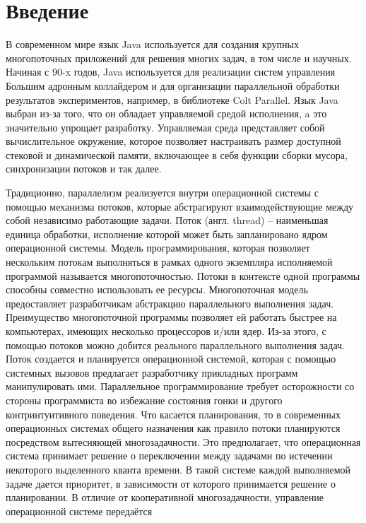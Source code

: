 \section{Введение}
	В современном мире язык Java используется для создания крупных многопоточных приложений 
	для решения многих задач, в том числе и научных. Начиная с 90-x годов, Java используется для реализации
	систем управления Большим адронным коллайдером и для организации параллельной обработки результатов 
	экспериментов, например, в библиотеке Colt Parallel\cite{colt}. Язык Java выбран из-за того, что он 
	обладает управляемой средой исполнения, a это значительно упрощает разработку. Управляемая среда представляет
	собой вычислительное окружение, которое позволяет настраивать размер доступной стековой и динамической памяти,
	включающее в себя функции сборки мусора, синхронизации потоков и так далее.
	\par
	Традиционно, параллелизм реализуется внутри операционной системы с помощью механизма потоков, 
	которые абстрагируют взаимодействующие между собой независимо работающие задачи. 
	Поток (англ. thread) -- наименьшая единица обработки, исполнение которой может 
	быть запланировано ядром операционной системы\cite{thread}. 
	Модель программирования, которая позволяет нескольким потокам выполняться в рамках одного экземпляра
	исполняемой программой называется многопоточностью. Потоки в контексте одной программы способны
	совместно использовать ее ресурсы. Многопоточная модель предоставляет
	разработчикам абстракцию параллельного выполнения задач. Преимущество многопоточной программы 
	позволяет ей работать быстрее на компьютерах, имеющих несколько процессоров и/или ядер. Из-за этого, с
	помощью потоков можно добится реального параллельного выполнения задач. Поток создается и планируется
	операционной системой, которая с помощью системных вызовов предлагает разработчику прикладных программ
	манипулировать ими. Параллельное программирование требует осторожности со стороны программиста во
	избежание состояния гонки и другого контринтуитивного поведения. 
	Что касается планирования, то в современных операционных системах общего назначения как правило потоки
	планируются посредством вытесняющей многозадачности. Это предполагает, что операционная система принимает
	решение о переключении между задачами по истечении некоторого выделенного кванта времени\cite{multitask}.
	В такой системе каждой выполняемой задаче дается приоритет, в зависимости от которого принимается решение
	о планировании. В отличие от кооперативной многозадачности, управление операционной системе передаётся
